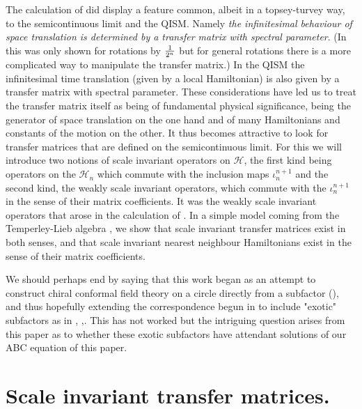 \documentclass[11pt]{amsart}
\newcommand{\1}{\mathcal I}
\newcommand{\5}{\vskip 5pt}
\begin{document}
  The calculation of \cite{jonogo} did display a feature common, albeit in a topsey-turvey way, to the semicontinuous limit and the QISM. Namely \emph{the infinitesimal behaviour of space translation is determined  by a transfer matrix with spectral parameter}. (In \cite{jonogo} this was only shown for rotations by $1\over 2^n$ but
  for general rotations there is a more complicated way to manipulate the transfer matrix.) In the QISM the infinitesimal time translation (given by a local Hamiltonian)
  is also given by a transfer matrix with spectral parameter.  These considerations have led us
  to treat the transfer matrix itself as being of fundamental physical significance, being the generator of space translation on the one
  hand and of many Hamiltonians
  and constants of the motion on the other. It thus becomes attractive to look for transfer matrices that are defined on the semicontinuous
  limit. For this we will introduce two notions of scale invariant operators  on $\mathcal H$, the first kind being operators
  on the $\mathcal H_n$ which commute with the inclusion maps $\iota_n^{n+1}$ and the second kind, the weakly scale 
  invariant operators, which commute with the $\iota_n^{n+1}$ in the sense of their  matrix coefficients.
  It was the weakly scale invariant operators that arose in the calculation of \cite{jonogo}. In a simple model coming from 
  the Temperley-Lieb algebra \cite{TL}, we show that scale invariant transfer matrices
  exist in both senses, and that scale invariant nearest neighbour  Hamiltonians exist in the sense of their matrix coefficients.
  
  We should perhaps end by saying that this work began as an attempt to construct chiral conformal field theory on 
  a circle directly from a subfactor (\cite{jo1}), and thus hopefully extending the correspondence begun in \cite{Wa7} to include
  "exotic" subfactors as in \cite{AH}, \cite{EG11},\cite{JMS}.  This has not worked but the intriguing question arises from this paper
  as to whether these exotic subfactors have attendant solutions of our ABC equation of this paper.
  
 \section{Scale invariant transfer matrices.}
\end{document}

